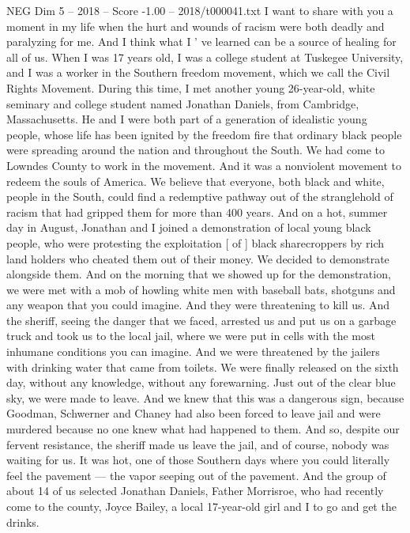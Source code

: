 \begin{textsample}{NEG Dim 5 – 2018 – Score -1.00 – 2018/t000041.txt}  \label{ex:f5_neg_018}
I want to share with you a moment in my life when the hurt and wounds of racism were both deadly and paralyzing for me.
And I think what I ' ve learned can be a source of healing for all of us.
When I was 17 years old, I was a college student at Tuskegee University, and I was a worker in the Southern freedom movement, which we call the Civil Rights Movement.
During this time, I met another young 26-year-old, white seminary and college student named Jonathan Daniels, from Cambridge, Massachusetts.
He and I were both part of a generation of idealistic young people, whose life has been ignited by the freedom fire that ordinary black people were spreading around the nation and throughout the South.
We had come to Lowndes County to work in the movement.
And it was a nonviolent movement to redeem the souls of America.
We believe that everyone, both black and white, people in the South, could find a redemptive pathway out of the stranglehold of racism that had gripped them for more than 400 years.
And on a hot, summer day in August, Jonathan and I joined a demonstration of local young black people, who were protesting the exploitation [ of ] black sharecroppers by rich land holders who cheated them out of their money.
We decided to demonstrate alongside them.
And on the morning that we showed up for the demonstration, we were met with a mob of howling white men with baseball bats, shotguns and any weapon that you could imagine.
And they were threatening to kill us.
And the sheriff, seeing the danger that we faced, arrested us and put us on a garbage truck and took us to the local jail, where we were put in cells with the most inhumane conditions you can imagine.
And we were threatened by the jailers with drinking water that came from toilets.
We were finally released on the sixth day, without any knowledge, without any forewarning.
Just out of the clear blue sky, we were made to leave.
And we knew that this was a dangerous sign, because Goodman, Schwerner and Chaney had also been forced to leave jail and were murdered because no one knew what had happened to them.
And so, despite our fervent resistance, the sheriff made us leave the jail, and of course, nobody was waiting for us.
It was hot, one of those Southern days where you could literally feel the pavement — the vapor seeping out of the pavement.
And the group of about 14 of us selected Jonathan Daniels, Father Morrisroe, who had recently come to the county, Joyce Bailey, a local 17-year-old girl and I to go and get the drinks.

\end{textsample}
